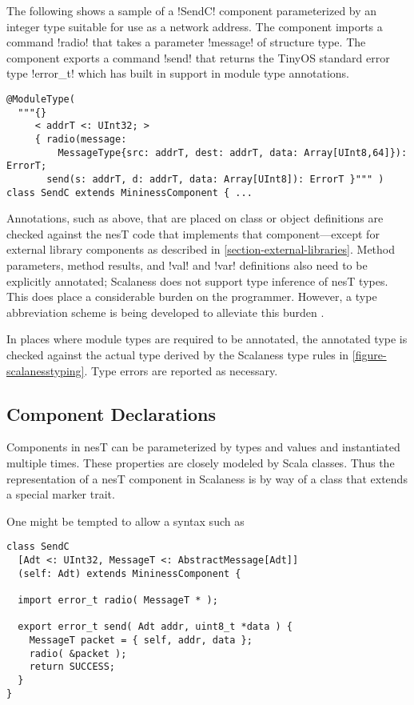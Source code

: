 The following shows a sample of a !SendC! component parameterized by an integer type suitable
for use as a network address. The component imports a command !radio! that takes a parameter
!message! of structure type. The component exports a command !send! that returns the TinyOS
standard error type !error_t! which has built in support in module type annotations.

\singlespace
\begin{lstlisting}[language=scalaness]
@ModuleType(
  """{}
     < addrT <: UInt32; >
     { radio(message:
         MessageType{src: addrT, dest: addrT, data: Array[UInt8,64]}): ErrorT;
       send(s: addrT, d: addrT, data: Array[UInt8]): ErrorT }""" )
class SendC extends MininessComponent { ...
\end{lstlisting}
\primaryspacing

Annotations, such as above, that are placed on class or object definitions are checked against
the nesT code that implements that component---except for external library components as
described in \autoref{section-external-libraries}. Method parameters, method results, and !val!
and !var! definitions also need to be explicitly annotated; Scalaness does not support type
inference of nesT types. This does place a considerable burden on the programmer. However, a
type abbreviation scheme is being developed to alleviate this burden
\cite{watson-masters-2013}.

In places where module types are required to be annotated, the annotated type is checked against
the actual type derived by the Scalaness type rules in \autoref{figure-scalanesstyping}. Type
errors are reported as necessary.

\subsection{Component Declarations}
\label{section-component-declarations}

Components in nesT can be parameterized by types and values and instantiated multiple times.
These properties are closely modeled by Scala classes. Thus the representation of a nesT
component in Scalaness is by way of a class that extends a special marker trait.

One might be tempted to allow a syntax such as

\singlespace
\begin{lstlisting}[language=scalaness]
class SendC
  [Adt <: UInt32, MessageT <: AbstractMessage[Adt]]
  (self: Adt) extends MininessComponent {

  import error_t radio( MessageT * );

  export error_t send( Adt addr, uint8_t *data ) {
    MessageT packet = { self, addr, data };
    radio( &packet );
    return SUCCESS;
  }
}
\end{lstlisting}
\primaryspacing

